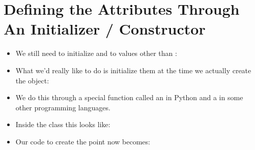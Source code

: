 \documentclass[letterpaper,10pt,english]{sphinxmanual}
\begin{document}
\section{Defining the Attributes Through An Initializer / Constructor}
\label{\detokenize{lecture_notes/lec18_classes1:defining-the-attributes-through-an-initializer-constructor}}\begin{itemize}
\item {} 
We still need to initialize  and  to values other than
:

\begin{sphinxVerbatim}[commandchars=\\\{\}]
  
  
  
\end{sphinxVerbatim}

\item {} 
What we’d really like to do is initialize them at the time we
actually create the  object:

\begin{sphinxVerbatim}[commandchars=\\\{\}]
   
\end{sphinxVerbatim}

\item {} 
We do this through a special function called an  in
Python and a  in some other programming languages.

\item {} 
Inside the class this looks like:

\begin{sphinxVerbatim}[commandchars=\\\{\}]
 
       
          
          
\end{sphinxVerbatim}

\item {} 
Our code to create the point now becomes:


\end{itemize}
\end{document}
